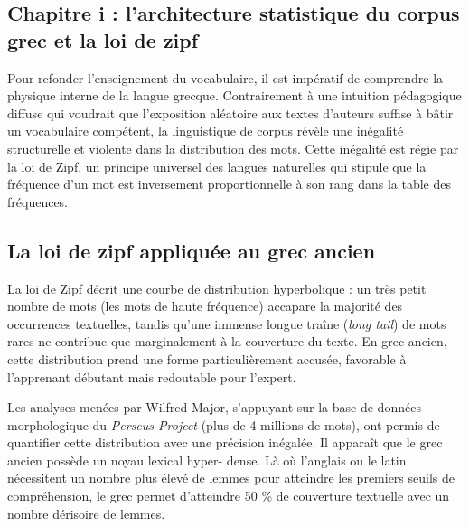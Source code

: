 {\subsection{Chapitre i : l'architecture statistique du corpus grec et la loi de zipf}

Pour refonder l'enseignement du vocabulaire, il est impératif de comprendre la \og physique\fg{}
interne de la langue grecque. Contrairement à une intuition pédagogique diffuse qui voudrait que
l'exposition aléatoire aux textes d'auteurs suffise à bâtir un vocabulaire compétent, la
linguistique de corpus révèle une inégalité structurelle et violente dans la distribution des mots.
Cette inégalité est régie par la loi de Zipf, un principe universel des langues naturelles qui
stipule que la fréquence d'un mot est inversement proportionnelle à son rang dans la table des
fréquences.\cite{III-1-1-ref3}



\subsection{La loi de zipf appliquée au grec ancien}

La loi de Zipf décrit une courbe de distribution hyperbolique : un très petit nombre de mots (les
mots de haute fréquence) accapare la majorité des occurrences textuelles, tandis qu'une immense \og
longue traîne\fg{} (\textit{long tail}) de mots rares ne contribue que marginalement à la couverture
du texte. En grec ancien, cette distribution prend une forme particulièrement accusée, favorable à
l'apprenant débutant mais redoutable pour l'expert.

Les analyses menées par Wilfred Major, s'appuyant sur la base de données morphologique du
\textit{Perseus Project} (plus de 4 millions de mots), ont permis de quantifier cette distribution
avec une précision inégalée. Il apparaît que le grec ancien possède un noyau lexical \og hyper-
dense\fg{}. Là où l'anglais ou le latin nécessitent un nombre plus élevé de lemmes pour atteindre
les premiers seuils de compréhension, le grec permet d'atteindre 50 \% de couverture textuelle avec
un nombre dérisoire de lemmes.

}
